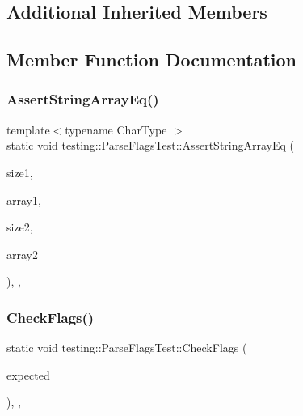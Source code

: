 \subsection*{Additional Inherited Members}


\subsection{Member Function Documentation}
\mbox{\label{classtesting_1_1ParseFlagsTest_a5d93780e65e1aa304334a8d4372c51fc}} 
\subsubsection{\texorpdfstring{AssertStringArrayEq()}{AssertStringArrayEq()}}
{\footnotesize\ttfamily template$<$typename Char\+Type $>$ \\
static void testing\+::\+Parse\+Flags\+Test\+::\+Assert\+String\+Array\+Eq (\begin{DoxyParamCaption}\item[{size\+\_\+t}]{size1,  }\item[{Char\+Type $\ast$$\ast$}]{array1,  }\item[{size\+\_\+t}]{size2,  }\item[{Char\+Type $\ast$$\ast$}]{array2 }\end{DoxyParamCaption})\hspace{0.3cm}{\ttfamily [inline]}, {\ttfamily [static]}, {\ttfamily [protected]}}

\mbox{\label{classtesting_1_1ParseFlagsTest_a5919553c35ebe3910fcff51cc0b59fd6}} 
\subsubsection{\texorpdfstring{CheckFlags()}{CheckFlags()}}
{\footnotesize\ttfamily static void testing\+::\+Parse\+Flags\+Test\+::\+Check\+Flags (\begin{DoxyParamCaption}\item[{const \mbox{\hyperlink{structtesting_1_1Flags}{Flags}} \&}]{expected }\end{DoxyParamCaption})\hspace{0.3cm}{\ttfamily [inline]}, {\ttfamily [static]}, {\ttfamily [protected]}}

